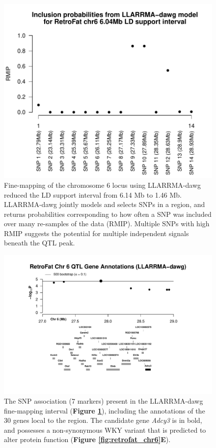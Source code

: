 \begin{figure}
\centering
\includegraphics[width=\textwidth, trim={0in 0in 0in 0.75in}, clip]{figures/5-hsrats/RetroFatg_chr6_finemapping_grayscale.pdf}
\caption[Fine-mapping of the RetroFat chromosome 6 QTL with LLARRMA-dawg]{Fine-mapping of the chromosome 6 locus using LLARRMA-dawg reduced the LD support interval from 6.14 Mb to 1.46 Mb. LLARRMA-dawg jointly models and selects SNPs in a region, and returns probabilities corresponding to how often a SNP was included over many re-samples of the data (RMIP). Multiple SNPs with high RMIP suggests the potential for multiple independent signals beneath the QTL peak.\label{fig:llarrma}}
\end{figure}

\begin{figure}
\centering
\includegraphics[width=\textwidth, trim={0in 1in 0 0.75in}, clip]{figures/5-hsrats/RetroFat_chr6_finemap_annotations.pdf}
\caption[Gene annotations for the LLARRMA-dawg fine-mapping interval]{The SNP association (7 markers) present in the LLARRMA-dawg fine-mapping interval (\textbf{Figure \ref{fig:llarrma}}), including the annotations of the 30 genes local to the region. The candidate gene \textit{Adcy3} is in bold, and possesses a non-synonymous WKY variant that is predicted to alter protein function (\textbf{Figure \ref{fig:retrofat_chr6}E}).\label{fig:annotations}}
\end{figure}

